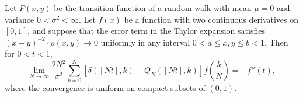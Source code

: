 Let $P(x,y)$ be the transition function of a random walk with mean $\mu = 0$ and variance $0 < \sigma^2 < \infty$. Let $f(x)$ be a function with two continuous derivatives on $[0,1]$, and suppose that the error term in the Taylor expansion satisfies $(x-y)^{-2} \cdot \rho(x,y) \to 0$ uniformly in any interval $0 < a \leq x, y \leq b < 1$. Then for $0 < t < 1$,
$$\lim_{N \to \infty} \frac{2N^2}{\sigma^2} \sum_{k=0}^{N} \left[ \delta([Nt],k) - Q_N([Nt],k) \right] f\left(\frac{k}{N}\right) = -f''(t),$$
where the convergence is uniform on compact subsets of $(0,1)$.
